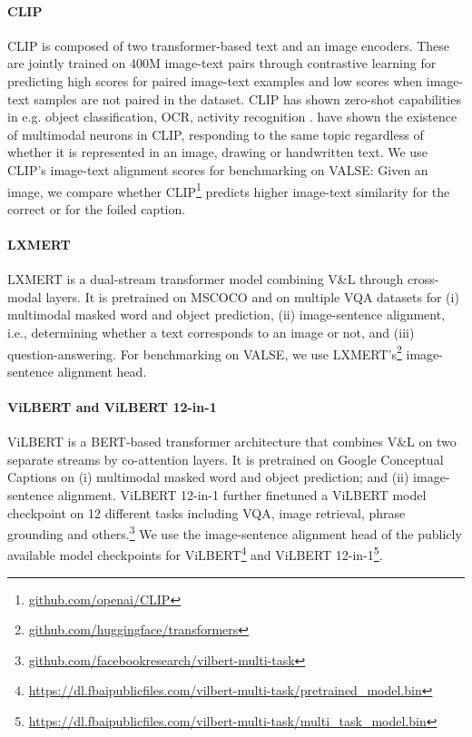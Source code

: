 \documentclass[11pt]{article}
\newcommand{\dataset}{VALSE}
\begin{document}
\paragraph{CLIP}
CLIP \cite{radford2021learning} is composed of two transformer-based text and an image encoders. These are jointly trained on 400M image-text pairs through contrastive learning for predicting high scores for paired image-text examples and low scores when image-text samples are not paired in the dataset. CLIP has shown zero-shot capabilities in e.g. object classification, OCR, activity recognition \cite{radford2021learning}. \citet{goh2021multimodal} have shown the existence of multimodal neurons in CLIP, responding to the same topic regardless of whether it is represented in an image, drawing or handwritten text. We use CLIP's image-text alignment scores for benchmarking on \dataset{}: Given an image, we compare whether CLIP\footnote{\url{github.com/openai/CLIP}} 
predicts higher image-text similarity for the correct or for the foiled caption.

\paragraph{LXMERT}
LXMERT \cite{tan-bansal-2019-lxmert} is a dual-stream transformer model combining V\&L through cross-modal layers. It is pretrained on MSCOCO \cite{Lin-etal:2014:mscoco} and on multiple VQA datasets for (i) multimodal masked word and object prediction, (ii) image-sentence alignment, i.e., determining whether a text corresponds to an image or not, and (iii) question-answering. For benchmarking on \dataset{}, we use LXMERT's\footnote{\url{github.com/huggingface/transformers}} 
image-sentence alignment head.

\paragraph{ViLBERT and ViLBERT 12-in-1} ViLBERT \citep{lu2019vilbert} is a BERT-based transformer architecture that combines V\&L on two separate streams by co-attention layers. It is pretrained on Google Conceptual Captions \citep{sharma2018conceptual} on (i) multimodal masked word and object prediction; and (ii) image-sentence alignment.
ViLBERT 12-in-1 \citep{lu2020vilbert12in1} further finetuned a ViLBERT model checkpoint on 12 different tasks including VQA, image retrieval, phrase grounding and others.\footnote{\url{github.com/facebookresearch/vilbert-multi-task}}
We use the image-sentence alignment head of the publicly available model checkpoints for ViLBERT\footnote{\url{https://dl.fbaipublicfiles.com/vilbert-multi-task/pretrained_model.bin}} and ViLBERT 12-in-1\footnote{\url{https://dl.fbaipublicfiles.com/vilbert-multi-task/multi_task_model.bin}}.
\end{document}
